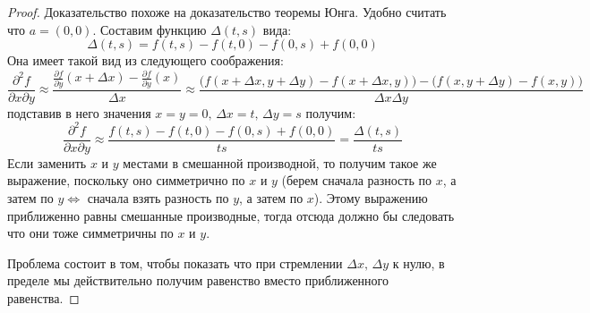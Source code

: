 \documentclass[12pt]{article}
\theoremstyle{definition}
\begin{document}
\begin{proof}
	Доказательство похоже на доказательство теоремы Юнга. Удобно считать что $a = (0,0)$. Составим функцию $\Delta(t,s)$ вида: 
	$$
		\Delta(t,s) = f(t,s) - f(t,0) - f(0,s) + f(0,0)
	$$
	Она имеет такой вид из следующего соображения:
	$$
		\dfrac{\partial^2 f}{\partial x \partial y} \approx \dfrac{\tfrac{\partial f}{\partial y}(x + \Delta x) - \tfrac{\partial f}{\partial y}(x)}{\Delta x} \approx \dfrac{\big(f(x + \Delta x, y + \Delta y) - f(x + \Delta x, y)\big) - \big(f(x, y + \Delta y) - f(x, y)\big)}{\Delta x \Delta y}
	$$
	подставив в него значения $x = y =0, \, \Delta x = t, \, \Delta y = s$ получим:
	$$
		\dfrac{\partial^2 f}{\partial x \partial y} \approx \dfrac{f(t,s) - f(t,0) - f(0,s) + f(0,0)}{ts} = \dfrac{\Delta(t,s)}{ts}
	$$
	Если заменить $x$ и $y$ местами в смешанной производной, то получим такое же выражение, поскольку оно симметрично по $x$ и $y$ (берем сначала разность по $x$, а затем по $y \Leftrightarrow$ сначала взять разность по $y$, а затем по $x$). Этому выражению приближенно равны смешанные производные, тогда отсюда должно бы следовать что они тоже симметричны по $x$ и $y$. 
	
	Проблема состоит в том, чтобы показать что при стремлении $\Delta x, \, \Delta y$ к нулю, в пределе мы действительно получим равенство вместо приближенного равенства. 
	

\end{proof}
\end{document}
